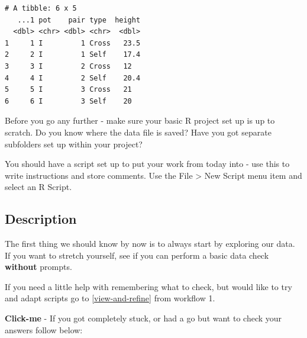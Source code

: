\documentclass[
]{book}
\makeatletter
\newenvironment{kframe}{%
\medskip{}
\setlength{\fboxsep}{.8em}
 \def\at@end@of@kframe{}%
 \ifinner\ifhmode%
  \def\at@end@of@kframe{\end{minipage}}%
  \begin{minipage}{\columnwidth}%
 \fi\fi%
 \def\FrameCommand##1{\hskip\@totalleftmargin \hskip-\fboxsep
 \colorbox{shadecolor}{##1}\hskip-\fboxsep
     \hskip-\linewidth \hskip-\@totalleftmargin \hskip\columnwidth}%
 \MakeFramed {\advance\hsize-\width
   \@totalleftmargin\z@ \linewidth\hsize
   \@setminipage}}%
 {\par\unskip\endMakeFramed%
 \at@end@of@kframe}
\newenvironment{block}[1]
  {
  \begin{itemize}
  \renewcommand{\labelitemi}{
    \raisebox{-.7\height}[0pt][0pt]{
      {\setkeys{Gin}{width=3em,keepaspectratio}\texttt{[image: images/\#1]}}
    }
  }
  \setlength{\fboxsep}{1em}
  \begin{kframe}
  \item
  }
  {
  \end{kframe}
  \end{itemize}
  }
\newenvironment{rmdwarning}
  {\begin{block}{warning}}
  {\end{block}}
\makeatother
\begin{document}
\begin{verbatim}
# A tibble: 6 x 5
   ...1 pot    pair type  height
  <dbl> <chr> <dbl> <chr>  <dbl>
1     1 I         1 Cross   23.5
2     2 I         1 Self    17.4
3     3 I         2 Cross   12  
4     4 I         2 Self    20.4
5     5 I         3 Cross   21  
6     6 I         3 Self    20 
\end{verbatim}

\begin{rmdwarning}
Before you go any further - make sure your basic R project set up is up
to scratch. Do you know where the data file is saved? Have you got
separate subfolders set up within your project?

You should have a script set up to put your work from today into - use
this to write instructions and store comments. Use the File
\textgreater{} New Script menu item and select an R Script.
\end{rmdwarning}

\hypertarget{description}{%
\subsection{Description}\label{description}}

The first thing we should know by now is to always start by exploring our data. If you want to stretch yourself, see if you can perform a basic data check \textbf{without} prompts.

If you need a little help with remembering what to check, but would like to try and adapt scripts go to \ref{view-and-refine} from workflow 1.

\textbf{Click-me} - If you got completely stuck, or had a go but want to check your answers follow below:
\end{document}
